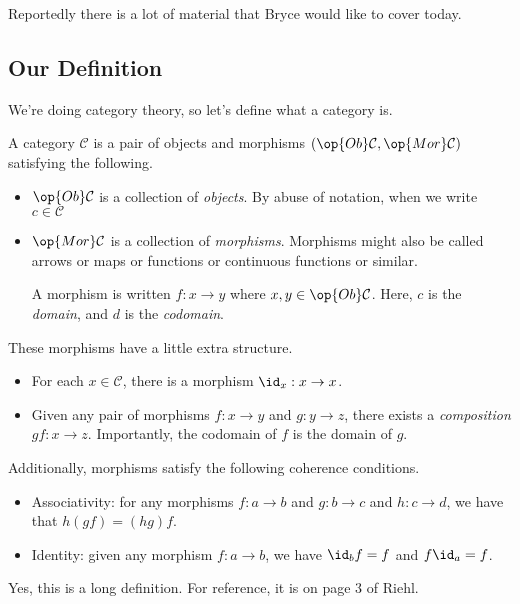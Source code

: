 







Reportedly there is a lot of material that Bryce would like to cover today.

\subsection{Our Definition}
We're doing category theory, so let's define what a category is.
\begin{definition}[Category]
	A category $\mathcal C$ is a pair of objects and morphisms $(\op{Ob}\mathcal C,\op{Mor}\mathcal C)$ satisfying the following.
	\begin{itemize}
		\item $\op{Ob}\mathcal C$ is a collection of \textit{objects}. By abuse of notation, when we write $c\in\mathcal C$ 
		\item $\op{Mor}\mathcal C$ is a collection of \textit{morphisms}. Morphisms might also be called arrows or maps or functions or continuous functions or similar.

		A morphism is written $f:x\to y$ where $x,y\in\op{Ob}\mathcal C$. Here, $c$ is the \textit{domain}, and $d$ is the \textit{codomain}.
	\end{itemize}
	These morphisms have a little extra structure.
	\begin{itemize}
		\item For each $x\in\mathcal C$, there is a morphism $\id_x:x\to x$.
		\item Given any pair of morphisms $f:x\to y$ and $g:y\to z$, there exists a \textit{composition} $gf:x\to z$. Importantly, the codomain of $f$ is the domain of $g$.
	\end{itemize}
	Additionally, morphisms satisfy the following coherence conditions.
	\begin{itemize}
		\item Associativity: for any morphisms $f:a\to b$ and $g:b\to c$ and $h:c\to d$, we have that $h(gf)=(hg)f$.
		\item Identity: given any morphism $f:a\to b$, we have $\id_bf=f$ and $f\id_a=f$.
	\end{itemize}
\end{definition}
\noindent Yes, this is a long definition. For reference, it is on page 3 of Riehl.

